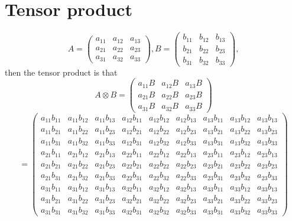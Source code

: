 \documentclass[dvipdfmx]{article}
\begin{document}
\section*{Tensor product}
 \[
   A=
   \left(
   \begin{array}{ccc}
   a_{11} & a_{12} & a_{13} \\
   a_{21} & a_{22}  & a_{23} \\
   a_{31} & a_{32} & a_{33}
   \end{array}
   \right) ,
   B =
   \left(
   \begin{array}{ccc}
   b_{11} & b_{12} & b_{13} \\
   b_{21} & b_{22}  & b_{23} \\
   b_{31} & b_{32} & b_{33}
   \end{array}
   \right) ,
 \]
then the tensor product is that
 \[
   A {\otimes} B =
   \left(
   \begin{array}{ccc}
   a_{11} B & a_{12} B  & a_{13} B \\
   a_{21} B & a_{22} B & a_{23} B \\
   a_{31} B & a_{32} B & a_{33} B
   \end{array}
  \right)
\]
\[
    =
   \left(
   \begin{array}{ccccccccc}
   a_{11} b_{11} & a_{11} b_{12} & a_{11} b_{13} & a_{12} b_{11} & a_{12} b_{12} & a_{12} b_{13} & a_{13} b_{11} & a_{13} b_{12} & a_{13} b_{13} \\
   a_{11} b_{21} & a_{11} b_{22} & a_{11} b_{23} & a_{12} b_{21} & a_{12} b_{22} & a_{12} b_{23} & a_{13} b_{21} & a_{13} b_{22} & a_{13} b_{23} \\
   a_{11} b_{31} & a_{11} b_{32} & a_{11} b_{33} & a_{12} b_{31} & a_{12} b_{32} & a_{12} b_{33} & a_{13} b_{31} & a_{13} b_{32} & a_{13} b_{33} \\
   a_{21} b_{11} & a_{21} b_{12} & a_{21} b_{13} & a_{22} b_{11} & a_{22} b_{12} & a_{22} b_{13} & a_{23} b_{11} & a_{23} b_{12} & a_{23} b_{13} \\
   a_{21} b_{21} & a_{21} b_{22} & a_{21} b_{23} & a_{22} b_{21} & a_{22} b_{22} & a_{22} b_{23} & a_{23} b_{21} & a_{23} b_{22} & a_{23} b_{23} \\
   a_{21} b_{31} & a_{21} b_{32} & a_{21} b_{33} & a_{22} b_{31} & a_{22} b_{32} & a_{22} b_{33} & a_{23} b_{31} & a_{23} b_{32} & a_{23} b_{33} \\
   a_{31} b_{11} & a_{31} b_{12} & a_{31} b_{13} & a_{32} b_{11} & a_{32} b_{12} & a_{32} b_{13} & a_{33} b_{11} & a_{33} b_{12} & a_{33} b_{13} \\
   a_{31} b_{21} & a_{31} b_{22} & a_{31} b_{23} & a_{32} b_{21} & a_{32} b_{22} & a_{32} b_{23} & a_{33} b_{21} & a_{33} b_{22} & a_{33} b_{23} \\
   a_{31} b_{31} & a_{31} b_{32} & a_{31} b_{33} & a_{32} b_{31} & a_{32} b_{32} & a_{32} b_{33} & a_{33} b_{31} & a_{33} b_{32} & a_{33} b_{33}
   \end{array}
   \right) 
 \]
\end{document}
